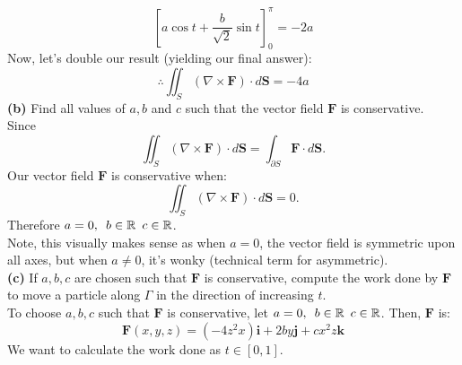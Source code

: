 \documentclass[12pt]{article}
\newcommand{\vect}[1]{\boldsymbol{#1}}
\begin{document}
$$
\left[
  a\cos t + \frac{b}{\sqrt{2}}\sin t
\right]^{\pi}_{0}=-2a
$$
Now, let's double our result (yielding our final answer):
$$
\therefore \iint_{S}(\nabla \times \mathbf{F})\cdot d \vect{S} = -4a
$$
\medskip
\textbf{(b)} Find all values of $a, b$ and $c$ such that the vector field $\mathbf{F}$ is conservative.\\
\smallskip
Since 
$$
\iint_{S}(\nabla \times \mathbf{F})\cdot d \vect{S}=\int_{\partial S}\mathbf{F}\cdot d \vect{S}.
$$
Our vector field $\mathbf{F}$ is conservative when:
$$
\iint_{S}(\nabla \times \mathbf{F})\cdot d \vect{S}=0.
$$
Therefore $a=0, \hspace{5px} b \in \mathbb{R} \hspace{5px} c \in \mathbb{R}$.\\
Note, this visually makes sense as when $a=0$, the vector field is symmetric upon all axes, but
when $a\neq 0$, it's wonky (technical term for asymmetric).\\
\medskip
\textbf{(c)} If $a,b,c$ are chosen such that $\mathbf{F}$ is conservative, 
compute the work done by $\mathbf{F}$ to move a particle along $\Gamma$ in the direction of increasing $t$.\\
\smallskip
To choose $a,b,c$ such that $\mathbf{F}$ is conservative, let $a=0, \hspace{5px} b \in \mathbb{R} \hspace{5px} c \in \mathbb{R}$.
Then, $\mathbf{F}$ is:
$$
\mathbf{F}(x,y,z)=(-4z^2x)\vect{i}+2by\vect{j}+cx^2z\vect{k}
$$
We want to calculate the work done as $t\in [0, 1]$.
\end{document}
